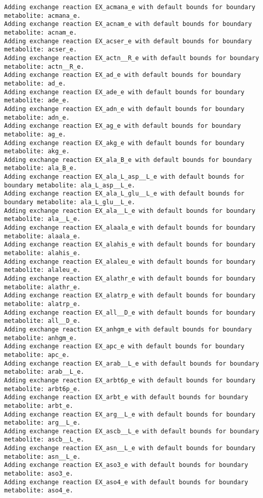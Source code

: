 \documentclass[
  letterpaper,
  DIV=11,
  numbers=noendperiod]{scrartcl}
\begin{document}
\begin{verbatim}
Adding exchange reaction EX_acmana_e with default bounds for boundary metabolite: acmana_e.
Adding exchange reaction EX_acnam_e with default bounds for boundary metabolite: acnam_e.
Adding exchange reaction EX_acser_e with default bounds for boundary metabolite: acser_e.
Adding exchange reaction EX_actn__R_e with default bounds for boundary metabolite: actn__R_e.
Adding exchange reaction EX_ad_e with default bounds for boundary metabolite: ad_e.
Adding exchange reaction EX_ade_e with default bounds for boundary metabolite: ade_e.
Adding exchange reaction EX_adn_e with default bounds for boundary metabolite: adn_e.
Adding exchange reaction EX_ag_e with default bounds for boundary metabolite: ag_e.
Adding exchange reaction EX_akg_e with default bounds for boundary metabolite: akg_e.
Adding exchange reaction EX_ala_B_e with default bounds for boundary metabolite: ala_B_e.
Adding exchange reaction EX_ala_L_asp__L_e with default bounds for boundary metabolite: ala_L_asp__L_e.
Adding exchange reaction EX_ala_L_glu__L_e with default bounds for boundary metabolite: ala_L_glu__L_e.
Adding exchange reaction EX_ala__L_e with default bounds for boundary metabolite: ala__L_e.
Adding exchange reaction EX_alaala_e with default bounds for boundary metabolite: alaala_e.
Adding exchange reaction EX_alahis_e with default bounds for boundary metabolite: alahis_e.
Adding exchange reaction EX_alaleu_e with default bounds for boundary metabolite: alaleu_e.
Adding exchange reaction EX_alathr_e with default bounds for boundary metabolite: alathr_e.
Adding exchange reaction EX_alatrp_e with default bounds for boundary metabolite: alatrp_e.
Adding exchange reaction EX_all__D_e with default bounds for boundary metabolite: all__D_e.
Adding exchange reaction EX_anhgm_e with default bounds for boundary metabolite: anhgm_e.
Adding exchange reaction EX_apc_e with default bounds for boundary metabolite: apc_e.
Adding exchange reaction EX_arab__L_e with default bounds for boundary metabolite: arab__L_e.
Adding exchange reaction EX_arbt6p_e with default bounds for boundary metabolite: arbt6p_e.
Adding exchange reaction EX_arbt_e with default bounds for boundary metabolite: arbt_e.
Adding exchange reaction EX_arg__L_e with default bounds for boundary metabolite: arg__L_e.
Adding exchange reaction EX_ascb__L_e with default bounds for boundary metabolite: ascb__L_e.
Adding exchange reaction EX_asn__L_e with default bounds for boundary metabolite: asn__L_e.
Adding exchange reaction EX_aso3_e with default bounds for boundary metabolite: aso3_e.
Adding exchange reaction EX_aso4_e with default bounds for boundary metabolite: aso4_e.

\end{verbatim}
\end{document}
